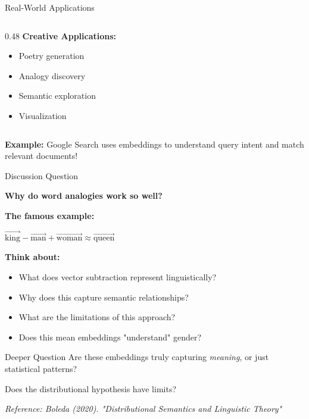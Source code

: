 \documentclass[aspectratio=169]{beamer}
\begin{document}
\begin{frame}[shrink=10]{Real-World Applications 🌟}
\begin{columns}[T]
\begin{column}{0.48\textwidth}
\vspace{0.5em}
\textbf{Creative Applications:}
\begin{itemize}\setlength{\itemsep}{0pt}
    \item Poetry generation
    \item Analogy discovery
    \item Semantic exploration
    \item Visualization
\end{itemize}
\end{column}
\end{columns}

\vspace{1em}
\textbf{Example:} Google Search uses embeddings to understand query intent and match relevant documents!
\end{frame}

\begin{frame}{Discussion Question 💬}
\begin{center}
\Large
\textbf{Why do word analogies work so well?}
\end{center}

\vspace{1em}

\textbf{The famous example:}
\begin{center}
$\vec{\text{king}} - \vec{\text{man}} + \vec{\text{woman}} \approx \vec{\text{queen}}$
\end{center}

\vspace{1em}

\textbf{Think about:}
\begin{itemize}\setlength{\itemsep}{0pt}
    \item What does vector subtraction represent linguistically?
    \item Why does this capture semantic relationships?
    \item What are the limitations of this approach?
    \item Does this mean embeddings "understand" gender?
\end{itemize}

\vspace{1em}

\begin{alertblock}{Deeper Question}
Are these embeddings truly capturing \textit{meaning}, or just statistical patterns?

Does the distributional hypothesis have limits?
\end{alertblock}

\small
\textit{Reference: Boleda (2020). "Distributional Semantics and Linguistic Theory"}
\end{frame}
\end{document}
